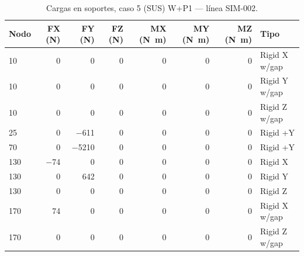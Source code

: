 \begin{table}[htbp]
  \centering
  \footnotesize
  \caption{Cargas en soportes, caso 5 (SUS) W+P1 — línea SIM-002.}
  \label{tab:restricciones-sus}
  \begin{tabular}{lrrrrrrl}
    \toprule
    Nodo & FX (\si{N}) & FY (\si{N}) & FZ (\si{N}) & MX (\si{N.m}) & MY (\si{N.m}) & MZ (\si{N.m}) & Tipo \\
    \midrule
    10 & \num{0} & \num{0} & \num{0} & \num{0} & \num{0} & \num{0} & Rigid X w/gap \\
    10 & \num{0} & \num{0} & \num{0} & \num{0} & \num{0} & \num{0} & Rigid Y w/gap \\
    10 & \num{0} & \num{0} & \num{0} & \num{0} & \num{0} & \num{0} & Rigid Z w/gap \\
    25 & \num{0} & \num{-611} & \num{0} & \num{0} & \num{0} & \num{0} & Rigid +Y \\
    70 & \num{0} & \num{-5210} & \num{0} & \num{0} & \num{0} & \num{0} & Rigid +Y \\
    130 & \num{-74} & \num{0} & \num{0} & \num{0} & \num{0} & \num{0} & Rigid X \\
    130 & \num{0} & \num{642} & \num{0} & \num{0} & \num{0} & \num{0} & Rigid Y \\
    130 & \num{0} & \num{0} & \num{0} & \num{0} & \num{0} & \num{0} & Rigid Z \\
    170 & \num{74} & \num{0} & \num{0} & \num{0} & \num{0} & \num{0} & Rigid X w/gap \\
    170 & \num{0} & \num{0} & \num{0} & \num{0} & \num{0} & \num{0} & Rigid Z w/gap \\
    \bottomrule
  \end{tabular}
\end{table}

